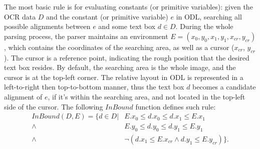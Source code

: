 The most basic rule is for evaluating constants (or primitive variables):
given the OCR data $D$ and the constant (or primitive variable) $e$ in ODL,
searching all possible alignments between $e$ and some text box $d \in D$.
During the whole parsing process, the parser maintains an environment
$E = (x_0, y_0, x_1, y_1, x_{cr}, y_{cr})$,
which contains the coordinates of the searching area,
as well as a cursor ($x_{cr}$, $y_{cr}$).
The cursor is a reference point, indicating the rough position
that the desired text box resides.
By default, the searching area is the whole image,
and the cursor is at the top-left corner.
The relative layout in ODL is represented in a
left-to-right then top-to-bottom manner,
thus the text box $d$ becomes a candidate alignment of $e$,
if it's within the searching area,
and not located in the top-left side of the cursor.
The following $InBound$ function defines such rule:
\begin{equation}
  \begin{aligned}
      InBound(D, E) = \{d \in D | &
      E.x_0 \leq d.x_0 \leq d.x_1 \leq E.x_1 \\
      \land &
      E.y_0 \leq d.y_0 \leq d.y_1 \leq E.y_1 \\
      \land & \lnot
      ( d.x_1 \leq E.x_{cr} \land d.y_1 \leq E.y_{cr} )
      \}. \\
  \end{aligned}
\end{equation}

